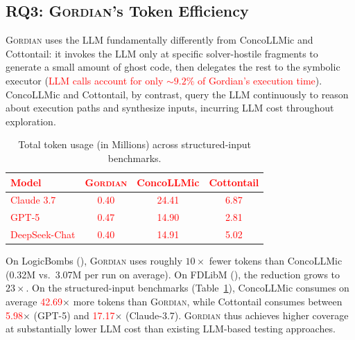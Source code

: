 \documentclass[acmsmall]{acmart}
\newcommand{\rev}[1]{\textcolor{red}{#1}}
\newcommand{\rev}[1]{#1}
\newcommand{\projName}{\textsc{Gordian}\xspace}
\theoremstyle{definition}
\begin{document}
\subsection{RQ3: \projName's Token Efficiency}


\projName{} uses the LLM fundamentally differently from ConcoLLMic and Cottontail: it invokes the LLM only at specific solver-hostile fragments to generate a small amount of ghost code, then delegates the rest to the symbolic executor (\rev{LLM calls account for only ${\sim}9.2\%$ of Gordian's execution time}). ConcoLLMic and Cottontail, by contrast, query the LLM continuously to reason about execution paths and synthesize inputs, incurring LLM cost throughout exploration.

\begin{table}
  \vspace{-3mm}
\centering
\caption{Total token usage (in Millions) across structured-input benchmarks.}
\label{tab:token-usage}
\footnotesize
\begin{tabular}{lccc}
\toprule
\rev{Model} & \rev{\projName{}} & \rev{ConcoLLMic} & \rev{Cottontail} \\
\midrule
\rev{Claude 3.7}    & \rev{0.40} & \rev{24.41} & \rev{6.87} \\
\rev{GPT-5}         & \rev{0.47} & \rev{14.90} & \rev{2.81} \\
\rev{DeepSeek-Chat} & \rev{0.40} & \rev{14.91} & \rev{5.02} \\
\bottomrule
\end{tabular}
  \vspace{-2mm}
\end{table}

On LogicBombs (), \projName{} uses roughly $10\times$ fewer tokens than ConcoLLMic (0.32M vs.\ 3.07M per run on average). On FDLibM (), the reduction grows to $23\times$. On the structured-input benchmarks (Table~\ref{tab:token-usage}), ConcoLLMic consumes on average \rev{42.69}$\times$ more tokens than \projName{}, while Cottontail consumes between \rev{5.98}$\times$ (GPT-5) and \rev{17.17}$\times$ (Claude-3.7). \projName{} thus achieves higher coverage at substantially lower LLM cost than existing LLM-based testing approaches.
\end{document}
